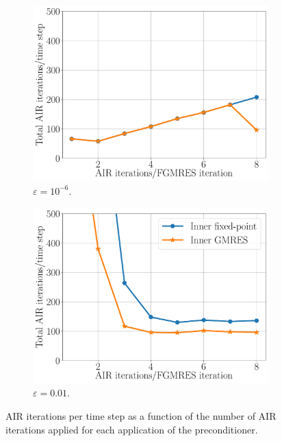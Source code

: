 \documentclass[review]{siamart}
\begin{document}
\begin{figure}[h!]
\centering

  \centering
  \begin{subfigure}[b]{0.475\textwidth}
	\includegraphics[width = \textwidth]{./figures/dg_advdiff_o2_1e-6.pdf}
	\caption{$\varepsilon = 10^{-6}$.}
	\label{fig:dg_o2_1e-6}
  \end{subfigure}
   \begin{subfigure}[b]{0.475\textwidth}
	\includegraphics[width = \textwidth]{./figures/dg_advdiff_o2_1e-2.pdf}
	\caption{$\varepsilon = 0.01$.}
	\label{fig:dg_o2_1e-2}
  \end{subfigure}
\caption{AIR iterations per time step as a function of the number of
AIR iterations applied for each application of the preconditioner.}
\label{fig:dg_o2}
\end{figure}
\end{document}
